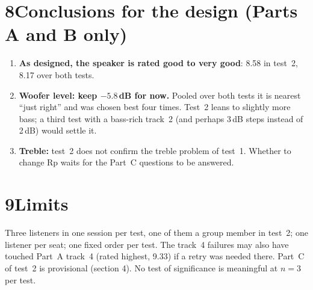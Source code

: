 \documentclass[11pt,a4paper]{article}
\begin{document}
\section*{8\quad Conclusions for the design (Parts A and B only)}
\begin{enumerate}\setlength{\itemsep}{2pt}
\item \textbf{As designed, the speaker is rated good to very good}: 8.58 in test~2, 8.17 over both tests.
\item \textbf{Woofer level: keep $-5.8$\,dB for now.} Pooled over both tests it is nearest ``just right'' and
was chosen best four times. Test~2 leans to slightly more bass; a third test with a bass-rich track~2 (and
perhaps 3\,dB steps instead of 2\,dB) would settle it.
\item \textbf{Treble:} test~2 does not confirm the treble problem of test~1. Whether to change Rp waits for
the Part~C questions to be answered.
\end{enumerate}

\section*{9\quad Limits}
Three listeners in one session per test, one of them a group member in test~2; one listener per seat; one
fixed order per test. The track~4 failures may also have touched Part~A track~4 (rated highest, 9.33) if a
retry was needed there. Part~C of test~2 is provisional (section 4). No test of significance is meaningful
at $n=3$ per test.
\end{document}
